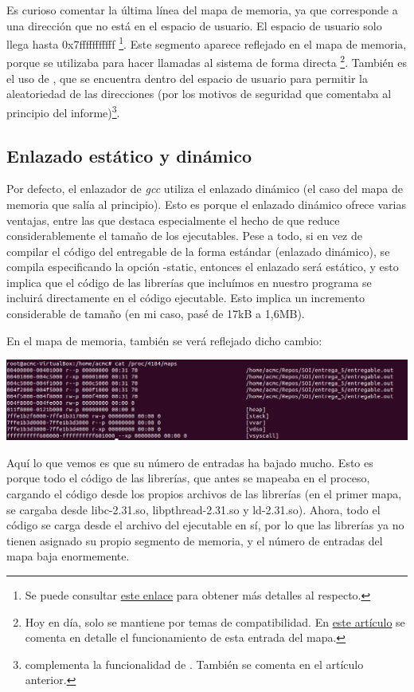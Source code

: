 \documentclass[a4paper]{article}
\begin{document}
Es curioso comentar la última línea del mapa de memoria, ya que corresponde a una dirección que no está en el espacio de usuario. El espacio de usuario solo llega hasta {\ttfamily 0x7fffffffffff} \footnote{Se puede consultar \href{https://www.kernel.org/doc/Documentation/x86/x86_64/mm.txt}{este enlace} para obtener más detalles al respecto.}. Este segmento aparece reflejado en el mapa de memoria, porque se utilizaba para hacer llamadas al sistema de forma directa \footnote{Hoy en día, solo se mantiene por temas de compatibilidad. En \href{https://lwn.net/Articles/446528/}{este artículo} se comenta en detalle el funcionamiento de esta entrada del mapa.}. También es el uso de {\ttfamily [vdso]}, que se encuentra dentro del espacio de usuario para permitir la aleatoriedad de las direcciones (por los motivos de seguridad que comentaba al principio del informe)\footnote{{\ttfamily [vvar]} complementa la funcionalidad de {\ttfamily [vdso]}. También se comenta en el artículo anterior.}.

\subsection{Enlazado estático y dinámico}

Por defecto, el enlazador de \emph{gcc} utiliza el enlazado dinámico (el caso del mapa de memoria que salía al principio). Esto es porque el enlazado dinámico ofrece varias ventajas, entre las que destaca especialmente el hecho de que reduce considerablemente el tamaño de los ejecutables. Pese a todo, si en vez de compilar el código del entregable de la forma estándar (enlazado dinámico), se compila especificando la opción {\ttfamily -static}, entonces el enlazado será estático, y esto implica que el código de las librerías que incluímos en nuestro programa se incluirá directamente en el código ejecutable. Esto implica un incremento considerable de tamaño (en mi caso, pasé de 17kB a 1,6MB).

En el mapa de memoria, también se verá reflejado dicho cambio:

\includegraphics[scale=0.408]{Captura_estatico.png}

Aquí lo que vemos es que su número de entradas ha bajado mucho. Esto es porque todo el código de las librerías, que antes se mapeaba en el proceso, cargando el código desde los propios archivos de las librerías (en el primer mapa, se cargaba desde {\ttfamily libc-2.31.so}, {\ttfamily libpthread-2.31.so} y {\ttfamily ld-2.31.so}). Ahora, todo el código se carga desde el archivo del ejecutable en sí, por lo que las librerías ya no tienen asignado su propio segmento de memoria, y el número de entradas del mapa baja enormemente.
\end{document}

